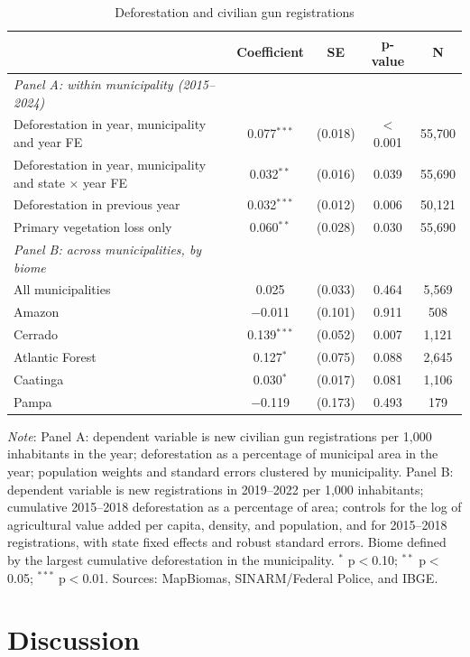 \documentclass[11pt,a4paper]{article}
\newcommand{\nota}[1]{\par\vspace{2pt}\begin{minipage}{\linewidth}\footnotesize\textit{Note}: #1\end{minipage}}
\begin{document}
\begin{table}[H]
\centering\footnotesize\setlength{\tabcolsep}{4pt}
\caption{Deforestation and civilian gun registrations}\label{tab:desm}
\begin{tabular}{lcccc}
\toprule
 & Coefficient & SE & p-value & N \\
\midrule
\textit{Panel A: within municipality (2015--2024)} &  &  &  &  \\
Deforestation in year, municipality and year FE & 0.077$^{***}$ & (0.018) & $<$0.001 & 55,700 \\
Deforestation in year, municipality and state $\times$ year FE & 0.032$^{**}$ & (0.016) & 0.039 & 55,690 \\
Deforestation in previous year & 0.032$^{***}$ & (0.012) & 0.006 & 50,121 \\
Primary vegetation loss only & 0.060$^{**}$ & (0.028) & 0.030 & 55,690 \\
\midrule
\textit{Panel B: across municipalities, by biome} &  &  &  &  \\
All municipalities & 0.025 & (0.033) & 0.464 & 5,569 \\
Amazon & $-$0.011 & (0.101) & 0.911 & 508 \\
Cerrado & 0.139$^{***}$ & (0.052) & 0.007 & 1,121 \\
Atlantic Forest & 0.127$^{*}$ & (0.075) & 0.088 & 2,645 \\
Caatinga & 0.030$^{*}$ & (0.017) & 0.081 & 1,106 \\
Pampa & $-$0.119 & (0.173) & 0.493 & 179 \\
\bottomrule
\end{tabular}
\nota{Panel A: dependent variable is new civilian gun registrations per 1,000 inhabitants in the year; deforestation as a percentage of municipal area in the year; population weights and standard errors clustered by municipality. Panel B: dependent variable is new registrations in 2019--2022 per 1,000 inhabitants; cumulative 2015--2018 deforestation as a percentage of area; controls for the log of agricultural value added per capita, density, and population, and for 2015--2018 registrations, with state fixed effects and robust standard errors. Biome defined by the largest cumulative deforestation in the municipality. $^{*}$ p$<$0.10; $^{**}$ p$<$0.05; $^{***}$ p$<$0.01. Sources: MapBiomas, SINARM/Federal Police, and IBGE.}
\end{table}

\section{Discussion}\label{sec:discussao}
\end{document}
